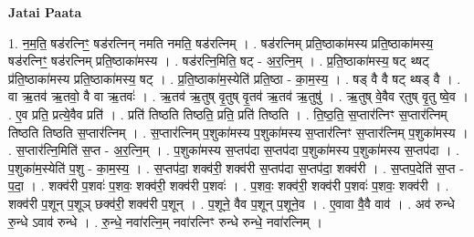 \documentclass[17pt]{extarticle}
\begin{document}
\textbf{Jatai Paata} \newline

1. न॒म॒ति॒ षड॑रत्निꣳ॒॒ षड॑रत्निन् नमति नमति॒ षड॑रत्निम् । . षड॑रत्निम् प्रति॒ष्ठाका॑मस्य प्रति॒ष्ठाका॑मस्य॒ षड॑रत्निꣳ॒॒ षड॑रत्निम् प्रति॒ष्ठाका॑मस्य । . षड॑रत्नि॒मिति॒ षट् - अ॒र॒त्नि॒म् । . प्र॒ति॒ष्ठाका॑मस्य॒ षट् थ्षट् प्र॑ति॒ष्ठाका॑मस्य प्रति॒ष्ठाका॑मस्य॒ षट् । . प्र॒ति॒ष्ठाका॑म॒स्येति॑ प्रति॒ष्ठा - का॒म॒स्य॒ । . षड् वै वै षट् थ्षड् वै । . वा ऋ॒तव॑ ऋ॒तवो॒ वै वा ऋ॒तवः॑ । . ऋ॒तव॑ ऋ॒तुष् वृ॒तुष् वृ॒तव॑ ऋ॒तव॑ ऋ॒तुषु॑ । . ऋ॒तुष् वे॒वैव र्‌तुष् वृ॒तु ष्वे॒व । . ए॒व प्रति॒ प्रत्ये॒वैव प्रति॑ । . प्रति॑ तिष्ठति तिष्ठति॒ प्रति॒ प्रति॑ तिष्ठति । . ति॒ष्ठ॒ति॒ स॒प्तार॑त्निꣳ स॒प्तार॑त्निम् तिष्ठति तिष्ठति स॒प्तार॑त्निम् । . स॒प्तार॑त्निम् प॒शुका॑मस्य प॒शुका॑मस्य स॒प्तार॑त्निꣳ स॒प्तार॑त्निम् प॒शुका॑मस्य । . स॒प्तार॑त्नि॒मिति॑ स॒प्त - अ॒र॒त्नि॒म् । . प॒शुका॑मस्य स॒प्तप॑दा स॒प्तप॑दा प॒शुका॑मस्य प॒शुका॑मस्य स॒प्तप॑दा । . प॒शुका॑म॒स्येति॑ प॒शु - का॒म॒स्य॒ । . स॒प्तप॑दा॒ शक्व॑री॒ शक्व॑री स॒प्तप॑दा स॒प्तप॑दा॒ शक्व॑री । . स॒प्तप॒देति॑ स॒प्त - प॒दा॒ । . शक्व॑री प॒शवः॑ प॒शवः॒ शक्व॑री॒ शक्व॑री प॒शवः॑ । . प॒शवः॒ शक्व॑री॒ शक्व॑री प॒शवः॑ प॒शवः॒ शक्व॑री । . शक्व॑री प॒शून् प॒शूञ् छक्व॑री॒ शक्व॑री प॒शून् । . प॒शूने॒ वैव प॒शून् प॒शूने॒व । . ए॒वावा वै॒वै वाव॑ । . अव॑ रुन्धे रु॒न्धे ऽवाव॑ रुन्धे । . रु॒न्धे॒ नवा॑रत्नि॒म् नवा॑रत्निꣳ रुन्धे रुन्धे॒ नवा॑रत्निम् । \newline
\end{document}
